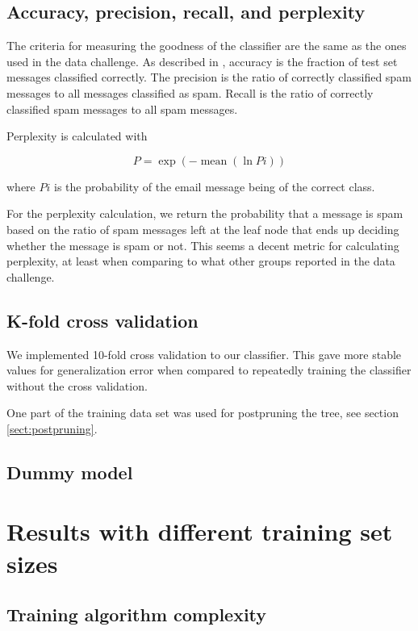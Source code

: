 \documentclass[a4paper,10pt]{article}
\begin{document}
\subsection{Accuracy, precision, recall, and perplexity}

The criteria for measuring the goodness of the classifier are the same
as the ones used in the data challenge.  As described in
\cite{termproject}, accuracy is the fraction of test set messages
classified correctly.  The precision is the ratio of correctly
classified spam messages to all messages classified as spam.  Recall is
the ratio of correctly classified spam messages to all spam messages.

Perplexity is calculated with

\begin{equation}
P = \exp(-\operatorname{mean}(\ln{Pi}))
\end{equation}

where $Pi$ is the probability of the email message being of the correct
class.

For the perplexity calculation, we return the probability that a message
is spam based on the ratio of spam messages left at the leaf node that
ends up deciding whether the message is spam or not.  This seems a
decent metric for calculating perplexity, at least when comparing to
what other groups reported in the data challenge.

\subsection{K-fold cross validation}

We implemented 10-fold cross validation to our classifier.  This
gave more stable values for generalization error when compared to
repeatedly training the classifier without the cross validation.

One part of the training data set was used for postpruning the tree, see
section \ref{sect:postpruning}.

\subsection{Dummy model}


\section{Results with different training set sizes}


\subsection{Training algorithm complexity}
\end{document}
